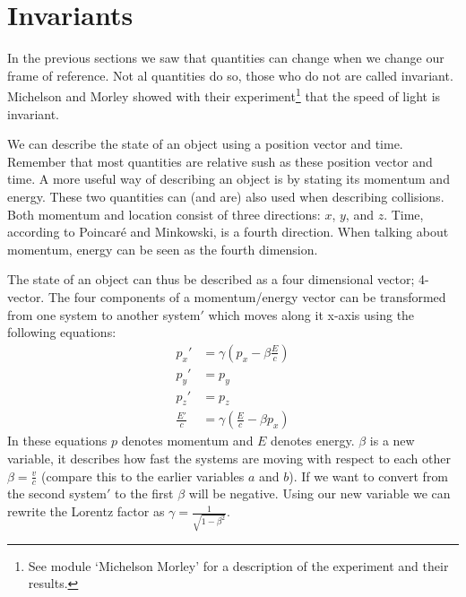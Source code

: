 \documentclass[12pt,a4paper]{article}
\numberwithin{equation}{section}
\numberwithin{figure}{section}
\numberwithin{table}{section}
\begin{document}
\section{Invariants}
In the previous sections we saw that quantities can change when we change our frame of reference. Not al quantities do so, those who do not are called invariant. Michelson and Morley showed with their experiment\footnote{See module `Michelson  Morley' for a description of the experiment and their results.} that the speed of light is invariant.

We can describe the state of an object using a position vector and time. Remember that most quantities are relative sush as these position vector and time. A more useful way of describing an object is by stating its momentum and energy. These two quantities can (and are) also used when describing collisions. Both momentum and location consist of three directions: $x$, $y$, and $z$. Time, according to Poincar\'e and Minkowski, is a fourth direction. When talking about momentum, energy can be seen as the fourth dimension.

The state of an object can thus be described as a four dimensional vector; 4-vector. The four components of a momentum/energy vector can be transformed from one system to another system$'$ which moves along it x-axis using the following equations:
\begin{equation}\label{eq:invar1}\begin{aligned}
p_x' &= \gamma \left( p_x - \beta \frac{E}{c} \right)  \\
p_y' &= p_y \\
p_z' &= p_z \\
\frac{E'}{c} &= \gamma \left( \frac{E}{c} - \beta p_x \right) 
\end{aligned}\end{equation}
In these equations $p$ denotes momentum and $E$ denotes energy. $\beta$ is a new variable, it describes how fast the systems are moving with respect to each other $\beta = \frac{v}{c}$ (compare this to the earlier variables $a$ and $b$). If we want to convert from the second system$'$ to the first $\beta$ will be negative. Using our new variable we can rewrite the Lorentz factor as $\gamma = \frac{1}{\sqrt{1-\beta^2}}$.
\end{document}

